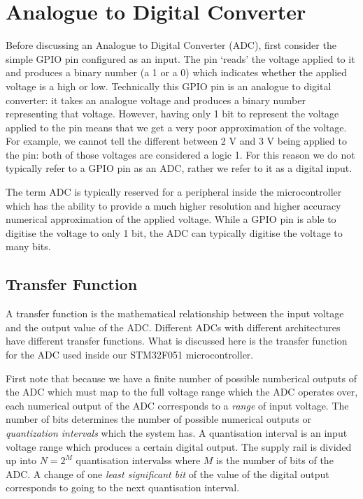 \chapter{Analogue to Digital Converter}

Before discussing an Analogue to Digital Converter (ADC), first consider the simple GPIO pin configured as an input. 
The pin `reads' the voltage applied to it and produces a binary number (a 1 or a 0) which indicates whether the applied voltage is a high or low. Technically this GPIO pin is an analogue to digital converter: it takes an analogue voltage and produces a binary number representing that voltage. 
However, having only 1 bit to represent the voltage applied to the pin means that we get a very poor approximation of the voltage. 
For example, we cannot tell the different between 2 V and 3 V being applied to the pin: both of those voltages are considered a logic 1. 
For this reason we do not typically refer to a GPIO pin as an ADC, rather we refer to it as a digital input.

The term ADC is typically reserved for a peripheral inside the microcontroller which has the ability to provide a much higher resolution and higher accuracy numerical approximation of the applied voltage. 
While a GPIO pin is able to digitise the voltage to only 1 bit, the ADC can typically digitise the voltage to many bits. 

\section{Transfer Function}
A transfer function is the mathematical relationship between the input voltage and the output value of the ADC.
Different ADCs with different architectures have different transfer functions. What is discussed here is the transfer function for the ADC used inside our STM32F051 microcontroller. 

First note that because we have a finite number of possible numberical outputs of the ADC which must map to the full voltage range which the ADC operates over, each numerical output of the ADC corresponds to a \emph{range} of input voltage. 
The number of bits determines the number of possible numerical outputs or \emph{quantization intervals} which the system has. A quantisation interval is an input voltage range which produces a certain digital output. The supply rail is divided up into \(N = 2^M\) quantisation intervalss where \(M\) is the number of bits of the ADC. 
A change of one \emph{least significant bit} of the value of the digital output corresponds to going to the next quantisation interval. 

